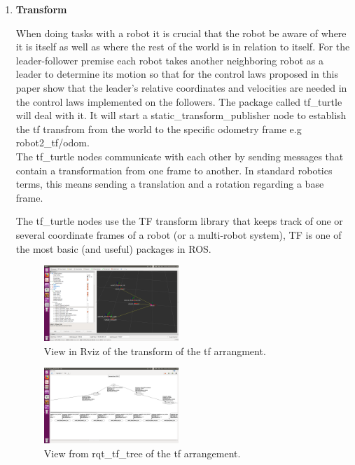 \documentclass[journal]{IEEEtran}
\begin{document}
\begin{enumerate}
\begin{enumerate}
\end{enumerate}



\item \textbf {Transform}

When doing tasks with a robot it is crucial that the robot be
aware of where it is itself as well as where the rest of the world
is in relation to itself. For the leader-follower premise each robot takes another neighboring robot as a leader to determine its motion so that for the control laws proposed in this paper show that the leader’s relative coordinates and velocities are needed in the control laws implemented on the followers. The package called tf{\_}turtle will deal with it. It will start a static{\_}transform{\_}publisher node to establish the tf transfrom from the world to the specific odometry frame e.g robot2{\_}tf/odom.\\
The tf{\_}turtle nodes communicate with each other by sending messages that contain a transformation from one frame to another. In standard robotics terms, this means sending a translation and a rotation regarding a base frame.

The tf{\_}turtle nodes use the TF transform library that keeps track of one or several coordinate frames of a robot (or a multi-robot system), TF is one of the most basic (and useful) packages in ROS.

\begin{figure}[!h]
\begin{center}
\includegraphics[width=2in]{robot4.png}
\caption{View in Rviz of the transform of the tf arrangment.}
\end{center}
\label{fig:mypicture2}
\end{figure}

\begin{figure}[!h]
\begin{center}
\includegraphics[width=2in]{3.png}
\caption{View from rqt{\_}tf{\_}tree of the tf arrangement.}
\end{center}
\label{fig:mypicture4}
\end{figure}



\end{enumerate}
\end{document}
